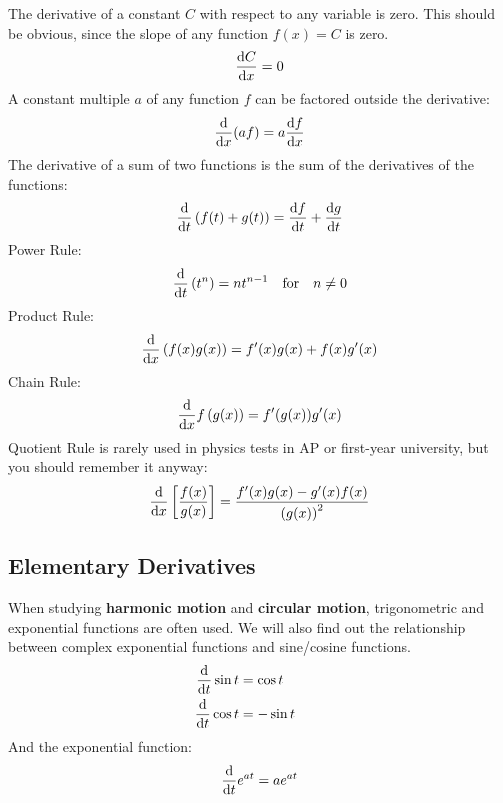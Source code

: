 \documentclass{../../../oss-handout}
\begin{document}
The derivative of a constant $C$ with respect to any variable is zero. This
should be obvious, since the slope of any function $f(x)=C$ is zero.
\begin{equation*}
  \diff Cx=0
\end{equation*}
A constant multiple $a$ of any function $f$ can be factored outside the
derivative:
\begin{equation*}
  \diff{}x(af)=a\diff fx
\end{equation*}
The derivative of a sum of two functions is the sum of the derivatives of the
functions:
\begin{equation*}
  \diff{}t\left(f(t)+g(t)\right) = \diff ft+\diff gt
\end{equation*}
Power Rule:
\begin{equation*}
  \diff{}t\left(t^n\right) = nt^{n-1}\quad\text{for}\quad n\neq 0
\end{equation*}
Product Rule:
\begin{equation*}
  \diff{}x\left(f(x)g(x)\right)=f'(x)g(x)+f(x)g'(x)
\end{equation*}
Chain Rule:
\begin{equation*}
  \diff{}xf\left(g(x)\right)=f'(g(x))g'(x)
\end{equation*}
Quotient Rule is rarely used in physics tests in AP or first-year university,
but you should remember it anyway:
\begin{equation*}
  \diff{}x\left[\frac{f(x)}{g(x)}\right]=
  \frac{f'(x)g(x)-g'(x)f(x)}{\left(g(x)\right)^2}
\end{equation*}



\subsection{Elementary Derivatives}
When studying \textbf{harmonic motion} and \textbf{circular motion},
trigonometric and exponential functions are often used. We will also find out
the relationship between complex exponential functions and sine/cosine
functions. %
\begin{align*}
    \diff{}t \sin t &= \cos t \quad\quad\quad\\
    \diff{}t \cos t &= -\sin t
\end{align*}
And the exponential function:
\begin{equation*}
  \diff{}t e^{at} = ae^{at}
\end{equation*}
\end{document}
